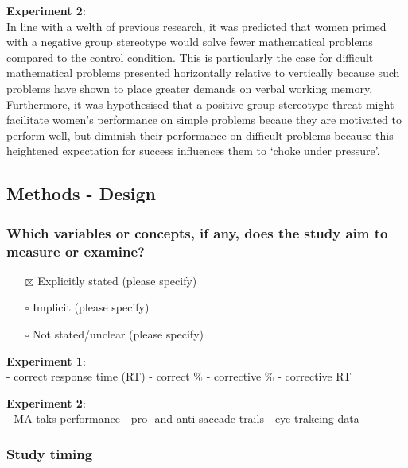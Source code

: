 \documentclass[
  doc, a4paper]{apa7}
\providecommand{\tightlist}{%
  \setlength{\itemsep}{0pt}\setlength{\parskip}{0pt}}
\begin{document}
\textbf{Experiment 2}:\\
In line with a welth of previous research, it was predicted that women primed with a negative group stereotype would solve fewer mathematical problems compared to the control condition. This is particularly the case for difficult mathematical problems presented horizontally relative to vertically because such problems have shown to place greater demands on verbal working memory.\\
Furthermore, it was hypothesised that a positive group stereotype threat might facilitate women's performance on simple problems becaue they are motivated to perform well, but diminish their performance on difficult problems because this heightened expectation for success influences them to `choke under pressure'.

\subsection{Methods - Design}\label{methods---design}

\subsubsection{Which variables or concepts, if any, does the study aim to measure or examine?}\label{which-variables-or-concepts-if-any-does-the-study-aim-to-measure-or-examine}

\begin{itemize}
\tightlist
\item[$\boxtimes$]
  Explicitly stated (please specify)\\
\item[$\square$]
  Implicit (please specify)\\
\item[$\square$]
  Not stated/unclear (please specify)
\end{itemize}

\textbf{Experiment 1}:\\
- correct response time (RT)
- correct \%
- corrective \%
- corrective RT

\textbf{Experiment 2}:\\
- MA taks performance
- pro- and anti-saccade trails
- eye-trakcing data

\subsubsection{Study timing}\label{study-timing}
\end{document}
